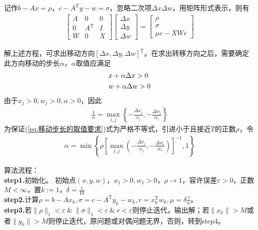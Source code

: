        记作$b-Ax=\rho$，$c-A^\mathrm{T} y-w=\sigma$，忽略二次项$\Delta x \Delta w$，用矩阵形式表示，则有
        \begin{align*}
        \begin{bmatrix} A & 0 & 0\\
        0 & A^{\mathrm{T}} & I\\ W & 0 & X \end{bmatrix}\begin{bmatrix}\Delta x\\\Delta y\\\Delta w \end{bmatrix}=\begin{bmatrix}\rho \\ \sigma \\\mu e-XWe \end{bmatrix}
        \end{align*}
        \par
        解上述方程，可求出移动方向$[\Delta x,\Delta y,\Delta w]^\mathrm{T} $。在求出转移方向之后，需要确定此方向移动的步长$\alpha$，$\alpha$取值应满足
        \begin{align}
        \label{eq:移动步长的取值要求}
        &x+\alpha \Delta x > 0 \\
        &w+\alpha \Delta w > 0 \notag
        \end{align}
        由于$x_j>0,w_j>0,\alpha >0$，因此
        \begin{align*}
        \frac{1}{\alpha}=\mathop {\max}\limits_{i,j}\left\{ -\frac{\Delta x_j}{x_j},-\frac{\Delta w_i}{w_i}\right\}
        \end{align*}
        为保证(\ref{eq:移动步长的取值要求})式为严格不等式，引进小于且接近$T$的正数$\rho$，令
        \begin{align*}
        {\alpha}=\mathop {\min}\left\{\rho\left[ \mathop {\max}\limits_{i,j} \left( -\frac{\Delta x_j}{x_j},-\frac{\Delta w_i}{w_i} \right)\right]^{-1},1\right\}
        \end{align*}
        \par
        算法流程：\\
        \textbf{step1.}初始化。
        初始点$(x,y,w)$，$x_1>0,w_1>0$，$\rho \to 1$，容许误差$\varepsilon > 0$，正数$M < \infty$，置$k:=1$，$\delta = \frac {1} {10}$\\
        \textbf{step2.}计算$\rho=b-Ax_k,\sigma=c-A^\mathrm{T} y_k-w_k,r=x_k^\mathrm{T} w_k,\mu=\delta \frac \gamma n$。\\
        \textbf{step3.}若$\|\rho\|_1<{\varepsilon \ \& \  \|\sigma}\|_1<\varepsilon\ \&\  r<\varepsilon$则停止迭代，输出解；若$\|x_k\|>M$或者$\|y_k\|>M$则停止迭代，原问题或对偶问题无界，否则，转到step4。\\
